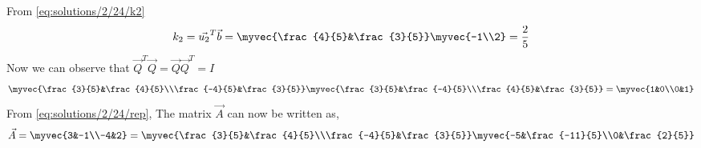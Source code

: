 From \eqref{eq:solutions/2/24/k2}
\begin{align}
    k_2=\vec{u_2}^T\vec{b}=\myvec{\frac{4}{5}&\frac{3}{5}}\myvec{-1\\2}=\frac{2}{5}
\end{align}
Now we can observe that $\vec{Q}^T\vec{Q}=\vec{Q}\vec{Q}^T=I$
\begin{align}
    \myvec{\frac{3}{5}&\frac{4}{5}\\\frac{-4}{5}&\frac{3}{5}}
    \myvec{\frac{3}{5}&\frac{-4}{5}\\\frac{4}{5}&\frac{3}{5}}=\myvec{1&0\\0&1}
\end{align}
From \eqref{eq:solutions/2/24/rep}, The matrix $\vec{A}$ can now be written as, 
\begin{align}
    \vec{A}=\myvec{3&-1\\-4&2}=\myvec{\frac{3}{5}&\frac{4}{5}\\\frac{-4}{5}&\frac{3}{5}}
    \myvec{-5&\frac{-11}{5}\\0&\frac{2}{5}}
\end{align}
